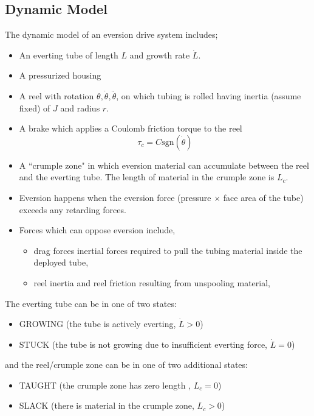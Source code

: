 \documentclass[letterpaper]{article}
\begin{document}
\subsection{Dynamic Model}
The dynamic model of an eversion drive system includes;
\begin{itemize}
  \item An everting tube of length $L$ and growth rate $\dot{L}$.
  \item A pressurized housing
  \item A reel with rotation $\theta, \dot{\theta}, \ddot{\theta}$, on which tubing is rolled having inertia (assume fixed) of
  $J$ and radius $r$.
  \item A brake which applies a Coulomb friction torque to the reel
  \[
    \tau_c = C\mathrm{sgn}(\dot{\theta})
  \]
  \item A ``crumple zone" in which eversion material can accumulate
  between the reel and the everting tube. The length of material in
  the crumple zone is $L_c$.
  \item Eversion happens when the eversion force (pressure $\times$ face area of the tube) exceeds any retarding forces.
  \item Forces which can oppose eversion include,
  \begin{itemize}
    \item drag forces inertial forces required to pull the tubing material
    inside the deployed tube,
    \item reel inertia and reel friction resulting from unspooling material,
  \end{itemize}
\end{itemize}

\noindent
The everting tube can be in one of two states:
\begin{itemize}
  \item GROWING (the tube is actively everting, $\dot{L}>0$)
  \item STUCK (the tube is not growing due to insufficient everting force, $\dot{L}=0$)
\end{itemize}
and the reel/crumple zone can be in one of two additional states:

\begin{itemize}
  \item TAUGHT (the crumple zone has zero length , $L_c = 0 $)
  \item SLACK (there is material in the crumple zone, $L_c > 0$)
\end{itemize}
\end{document}
